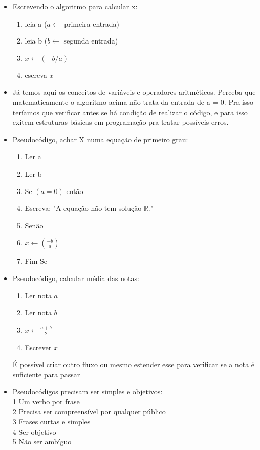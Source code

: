 \documentclass[12pt,a4paper]{article} %
\begin{document}
\begin{itemize}
\begin{itemize}
\end{itemize}
\item Escrevendo o algoritmo para calcular x:
\begin{enumerate}
\item leia a ($a \leftarrow$ primeira entrada)
\item leia b ($b \leftarrow$ segunda entrada)
\item $x \leftarrow (-b/a)$
\item escreva $x$
\end{enumerate}
\item Já temos aqui os conceitos de variáveis e operadores aritméticos. Perceba que matematicamente o algoritmo acima não trata da entrada de a = 0. Pra isso teríamos que verificar antes se há condição de realizar o código, e para isso exitem estruturas básicas em programação pra tratar possíveis erros.
\item Pseudocódigo, achar X numa equação de primeiro grau:
\begin{enumerate}
\item Ler a
\item Ler b
\item Se $(a=0)$ então
\item \tabto{1.1cm}Escreva: "A equação não tem solução $\mathbb{R}$."
\item Senão
\item \tabto{1.1cm}$x \leftarrow (\frac{-b}{a})$
\item Fim-Se
\end{enumerate}
\item Pseudocódigo, calcular média das notas:
\begin{enumerate}
\item Ler nota $a$
\item Ler nota $b$
\item $x \leftarrow \frac{a+b}{2}$
\item Escrever $x$
\end{enumerate}
É possivel criar outro fluxo ou mesmo estender esse para verificar se a nota é suficiente para passar
\item Pseudocódigos precisam ser simples e objetivos:\\
1 Um verbo por frase\\
2 Precisa ser compreensível por qualquer público\\
3 Frases curtas e simples\\
4 Ser objetivo\\
5 Não ser ambíguo\\

\end{itemize}
\end{document}
